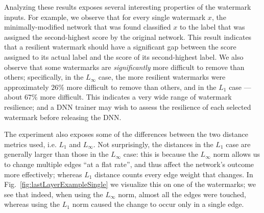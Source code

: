 \documentclass{easychair}
\newcommand{\guy}[1]{\marginpar{\textcolor{orange}{Guy: #1}}}
\begin{document}
Analyzing these results exposes several interesting properties of the
watermark inputs. For example, we observe 
that for every single watermark $x$, the minimally-modified network that
was found classified $x$ to the label that was assigned the second-highest score
 by the original network. This result indicates
that a resilient watermark should have a
significant gap between the score assigned to its actual label and
the score of its second-highest label. We also observe that some
watermarks are \emph{significantly} more difficult to remove than
others; specifically, in the $L_\infty$ case, the more resilient
watermarks were approximately $26\%$ more difficult to remove than
others, and in the $L_1$ case --- about $67\%$ more
difficult. \guy{TODO: Ben, please check these numbers with the raw
  data. Also, can you check if the hardest benchmarks had larger gaps
  between the winner and runner-up label?}
This indicates a very wide range of watermark resilience; and
a DNN trainer may wish to assess the resilience of each selected
watermark before releasing the DNN.


The experiment also exposes some of the differences between the two
distance metrics used, i.e. $L_1$ and $L_\infty$. Not surprisingly,
the distances in the $L_1$ case are generally larger than those in the
$L_\infty$ case: this is because the $L_\infty$ norm allows us to
change multiple edges ``at a flat rate'', and thus affect the
network's outcome more effectively; whereas $L_1$ distance counts
every edge weight that changes. In
Fig.~\ref{fig:lastLayerExampleSingle} we visualize this on one
of the watermarks; we see that indeed, when using the $L_\infty$ norm,
almost all the edges were touched, whereas using the $L_1$ norm caused the
change to occur only in a single edge.
\end{document}
